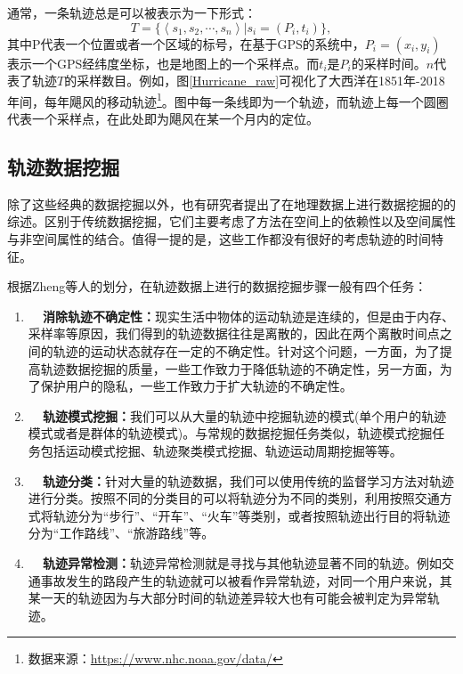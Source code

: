 通常，一条轨迹总是可以被表示为一下形式：
\begin{equation}
\label{eq:traj}
T = \{\left<s_1,s_2,\cdots,s_n\right>|s_i=(P_i,t_i)\},
\end{equation}
其中\gls{P}代表一个位置或者一个区域的标号，在基于GPS的系统中，$P_i = (x_i,y_i)$ 表示一个GPS经纬度坐标，也是地图上的一个采样点。而$t_i$是$P_i$的采样时间。$n$代表了轨迹$T$的采样数目。例如，图\ref{Hurricane_raw}可视化了大西洋在1851年-2018年间，每年飓风的移动轨迹\footnote{数据来源：\url{https://www.nhc.noaa.gov/data/}}。图中每一条线即为一个轨迹，而轨迹上每一个圆圈代表一个采样点，在此处即为飓风在某一个月内的定位。




\subsection{轨迹数据挖掘}
除了这些经典的数据挖掘以外，也有研究者提出了在地理数据上进行数据挖掘的的综述。区别于传统数据挖掘，它们主要考虑了方法在空间上的依赖性以及空间属性与非空间属性的结合。值得一提的是，这些工作都没有很好的考虑轨迹的时间特征。

根据Zheng等人的划分，在轨迹数据上进行的数据挖掘步骤一般有四个任务：


\begin{enumerate}
    \item \textbf{~~消除轨迹不确定性：}现实生活中物体的运动轨迹是连续的，但是由于内存、采样率等原因，我们得到的轨迹数据往往是离散的，因此在两个离散时间点之间的轨迹的运动状态就存在一定的不确定性。针对这个问题，一方面，为了提高轨迹数据挖掘的质量，一些工作致力于降低轨迹的不确定性，另一方面，为了保护用户的隐私，一些工作致力于扩大轨迹的不确定性。
    \item \textbf{~~轨迹模式挖掘：}我们可以从大量的轨迹中挖掘轨迹的模式(单个用户的轨迹模式或者是群体的轨迹模式)。与常规的数据挖掘任务类似，轨迹模式挖掘任务包括运动模式挖掘、轨迹聚类模式挖掘、轨迹运动周期挖掘等等。
    \item \textbf{~~轨迹分类：}针对大量的轨迹数据，我们可以使用传统的监督学习方法对轨迹进行分类。按照不同的分类目的可以将轨迹分为不同的类别，利用按照交通方式将轨迹分为“步行”、“开车”、“火车”等类别，或者按照轨迹出行目的将轨迹分为“工作路线”、“旅游路线”等。
    \item \textbf{~~轨迹异常检测：}轨迹异常检测就是寻找与其他轨迹显著不同的轨迹。例如交通事故发生的路段产生的轨迹就可以被看作异常轨迹，对同一个用户来说，其某一天的轨迹因为与大部分时间的轨迹差异较大也有可能会被判定为异常轨迹。
\end{enumerate}

